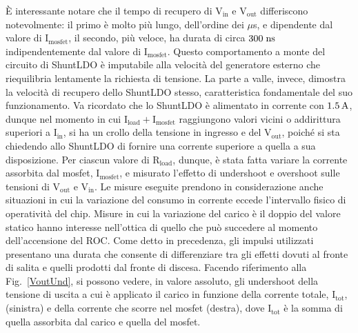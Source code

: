 \`E interessante notare che il tempo di recupero di $\mathrm{V_{in}}$ e $\mathrm{V_{out}}$ differiscono notevolmente: il primo è molto più lungo, dell'ordine dei $\mu$s, e dipendente dal valore di $\mathrm{I_{mosfet}}$, il secondo, più veloce, ha durata di circa $300 \rm \; ns$ indipendentemente dal valore di $\mathrm{I_{mosfet}}$.
Questo comportamento a monte del circuito di ShuntLDO è imputabile alla velocità del generatore esterno che riequilibria lentamente la richiesta di tensione. La parte a valle, invece, dimostra la velocità di recupero dello ShuntLDO stesso, caratteristica fondamentale del suo funzionamento.
Va ricordato che lo ShuntLDO è alimentato in corrente con $1.5 \rm \, A$, dunque nel momento in cui $\mathrm{I_{load}+I_{mosfet}}$ raggiungono valori vicini o addirittura superiori  a $\mathrm{I_{in}}$, si ha un crollo della tensione in ingresso e del $\mathrm{V_{out}}$, poiché si sta chiedendo allo ShuntLDO di fornire una corrente superiore a quella a sua disposizione.
Per ciascun valore di $\mathrm{R_{load}}$, dunque, è stata fatta variare la corrente assorbita dal mosfet, $\mathrm{I_{mosfet}}$, e misurato l'effetto di undershoot e overshoot sulle tensioni di $\mathrm{V_{out}}$ e $\mathrm{V_{in}}$. 
Le misure eseguite prendono in considerazione anche situazioni in cui la variazione del consumo in corrente eccede l'intervallo fisico di operatività del chip. Misure in cui la variazione del carico è il doppio del valore statico hanno interesse nell'ottica di quello che può succedere al momento dell'accensione del ROC. %
Come detto in precedenza, gli impulsi utilizzati presentano una durata che consente di differenziare tra gli effetti dovuti al fronte di salita e quelli prodotti dal fronte di discesa. 
Facendo riferimento alla Fig.~\ref{VoutUnd}, si possono vedere, in valore assoluto, gli undershoot della tensione di uscita a cui è applicato il carico in funzione della corrente totale, $\mathrm{I_{tot}}$, (sinistra) e della corrente che scorre nel mosfet (destra), dove  $\mathrm{I_{tot}}$ è la somma di quella assorbita dal carico e quella del mosfet. 
